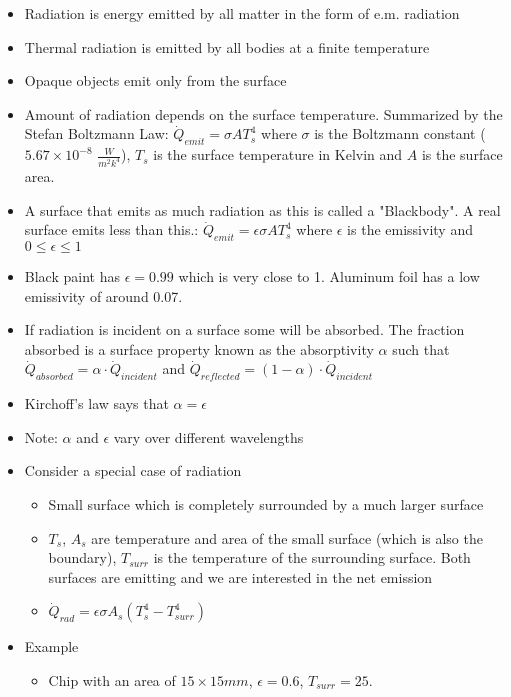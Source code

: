 \documentclass[12pt]{article}
\begin{document}
\begin{itemize}
    \item Radiation is energy emitted by all matter in the form of e.m. radiation
    \item Thermal radiation is emitted by all bodies at a finite temperature
    \item Opaque objects emit only from the surface
    \item Amount of radiation depends on the surface temperature. Summarized by the Stefan Boltzmann Law: $\dot{Q}_{emit} = \sigma A T_s^4$ where $\sigma$ is the Boltzmann constant ($5.67 \times 10^{-8}$ $\frac{W}{m^2k^4}$), $T_s$ is the surface temperature in Kelvin and $A$ is the surface area.
    \item A surface that emits as much radiation as this is called a "Blackbody". A real surface emits less than this.: $\dot{Q}_{emit} = \epsilon \sigma A T_s^4$ where $\epsilon$ is the emissivity and $0 \leq \epsilon \leq 1$ 
    \item Black paint has $\epsilon = 0.99$ which is very close to 1. Aluminum foil has a low emissivity of around 0.07. 
    \item If radiation is incident on a surface some will be absorbed. The fraction absorbed is a surface property known as the absorptivity $\alpha$ such that $\dot{Q}_{absorbed} = \alpha \cdot \dot{Q}_{incident}$ and $\dot{Q}_{reflected} = (1-\alpha) \cdot \dot{Q}_{incident}$
    \item Kirchoff's law says that $\alpha = \epsilon$
    \item Note: $\alpha$ and $\epsilon$ vary over different wavelengths
    \item Consider a special case of radiation \begin{itemize}
        \item Small surface which is completely surrounded by a much larger surface
        \item $T_s$, $A_s$ are temperature and area of the small surface (which is also the boundary), $T_{surr}$ is the temperature of the surrounding surface. Both surfaces are emitting and we are interested in the net emission
        \item $\dot{Q}_{rad} = \epsilon \sigma A_s (T_s^4 - T_{surr}^4)$ 
    \end{itemize}
    \item Example \begin{itemize}
        \item Chip with an area of $15 \times 15 mm$, $\epsilon = 0.6$, $T_{surr} = 25$. 

\end{itemize}
\end{itemize}
\end{document}
